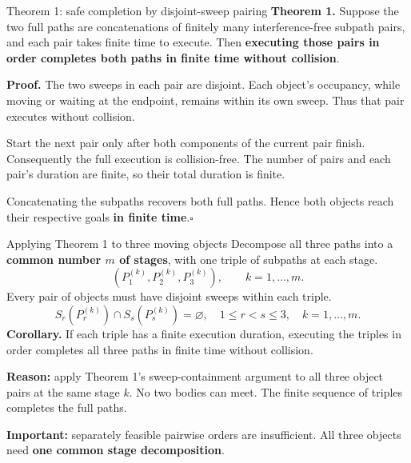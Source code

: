 \begin{frame}{Theorem 1: safe completion by disjoint-sweep pairing}
\textbf{Theorem 1.} Suppose the two full paths are concatenations of finitely many interference-free subpath pairs, and each pair takes finite time to execute. Then \textbf{executing those pairs in order completes both paths in finite time without collision}.
\medskip\par
\textbf{Proof.} The two sweeps in each pair are disjoint. Each object's occupancy, while moving or waiting at the endpoint, remains within its own sweep. Thus that pair executes without collision.
\medskip\par
Start the next pair only after both components of the current pair finish. Consequently the full execution is collision-free. The number of pairs and each pair's duration are finite, so their total duration is finite.
\medskip\par
Concatenating the subpaths recovers both full paths. Hence both objects reach their respective goals \textbf{in finite time}.\hfill$\square$
\end{frame}

\begin{frame}{Applying Theorem 1 to three moving objects}
Decompose all three paths into a \textbf{common number $m$ of stages}, with one triple of subpaths at each stage.
\[
\left(P_1^{(k)},P_2^{(k)},P_3^{(k)}\right),\qquad k=1,\ldots,m.
\]
Every pair of objects must have disjoint sweeps within each triple.
\begin{equation}
S_r(P_r^{(k)})\cap S_s(P_s^{(k)})=\varnothing,
\quad 1\le r<s\le3,\quad k=1,\ldots,m.
\tag{14}
\end{equation}
\textbf{Corollary.} If each triple has a finite execution duration, executing the triples in order completes all three paths in finite time without collision.
\medskip\par
\small \textbf{Reason:} apply Theorem 1's sweep-containment argument to all three object pairs at the same stage $k$. No two bodies can meet. The finite sequence of triples completes the full paths.
\medskip\par
\textbf{Important:} separately feasible pairwise orders are insufficient. All three objects need \textbf{one common stage decomposition}.
\end{frame}

